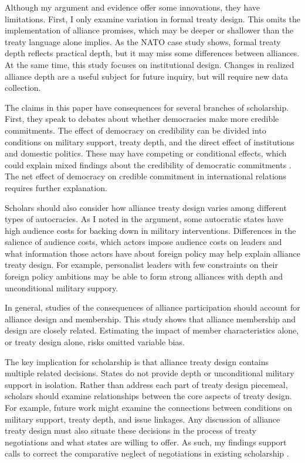 \documentclass[12pt]{article}
\begin{document}
Although my argument and evidence offer some innovations, they have limitations. 
First, I only examine variation in formal treaty design. 
This omits the implementation of alliance promises, which may be deeper or shallower than the treaty language alone implies. 
As the NATO case study shows, formal treaty depth reflects practical depth, but it may miss some differences between alliances. 
At the same time, this study focuses on institutional design. 
Changes in realized alliance depth are a useful subject for future inquiry, but will require new data collection. 


The claims in this paper have consequences for several branches of scholarship. 
First, they speak to debates about whether democracies make more credible commitments. 
The effect of democracy on credibility can be divided into conditions on military support, treaty depth, and the direct effect of institutions and domestic politics. 
These may have competing or conditional effects, which could explain mixed findings about the credibility of democratic commitments \citep{Schultz1999, Leeds1999, Thyne2012, DownesSechser2012}.
The net effect of democracy on credible commitment in international relations requires further explanation. 


Scholars should also consider how alliance treaty design varies among different types of autocracies. 
As I noted in the argument, some autocratic states have high audience costs for backing down in military interventions. 
Differences in the salience of audience costs, which actors impose audience costs on leaders and what information those actors have about foreign policy \citep{Weeks2008} may help explain alliance treaty design.
For example, personalist leaders with few constraints on their foreign policy ambitions may be able to form strong alliances with depth and unconditional military suppory. 


In general, studies of the consequences of alliance participation should account for alliance design and membership. 
This study shows that alliance membership and design are closely related. 
Estimating the impact of member characteristics alone, or treaty design alone, risks omitted variable bias. 


The key implication for scholarship is that alliance treaty design contains multiple related decisions. 
States do not provide depth or unconditional military support in isolation. 
Rather than address each part of treaty design piecemeal, scholars should examine relationships between the core aspects of treaty design. 
For example, future work might examine the connections between conditions on military support, treaty depth, and issue linkages.  
Any discussion of alliance treaty design must also situate these decisions in the process of treaty negotiations and what states are willing to offer.
As such, my findings support calls to correct the comparative neglect of negotiations in existing scholarship \citep{Poast2019a}. 
\end{document}

